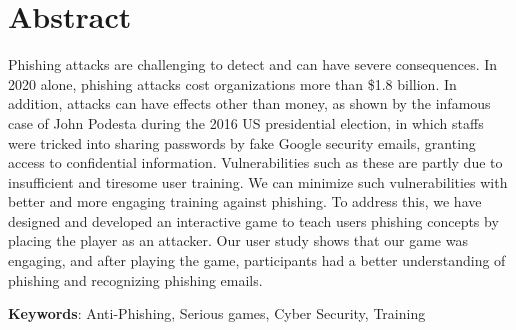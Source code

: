 

\chapter*{Abstract}

\pagestyle{plain} %
\setcounter{page}{8}
Phishing attacks are challenging to detect and can have severe consequences. In 2020 alone, phishing attacks cost organizations more than \$1.8 billion. In addition, attacks can have effects other than money, as shown by the infamous case of John Podesta during the 2016 US presidential election, in which staffs were tricked into sharing passwords by fake Google security emails, granting access to confidential information. Vulnerabilities such as these are partly due to insufficient and tiresome user training. We can minimize such vulnerabilities with better and more engaging training against phishing. To address this, we have designed and developed an interactive game to teach users phishing concepts by placing the player as an attacker. Our user study shows that our game was engaging, and after playing the game, participants had a better understanding of phishing and recognizing phishing emails.

\vspace{1em}
\noindent
\textbf{Keywords}: Anti-Phishing, Serious games, Cyber Security, Training
\pagebreak{}
